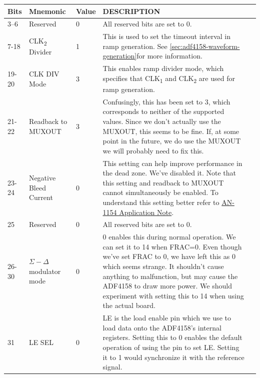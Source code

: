 \label{tab:adf4158-reg-map-4}
\begin{tabularx}{\textwidth}{l l l X>{\raggedright\arraybackslash}X}
        \caption{TEST REGISTER(R4) MAP} \\
        \toprule
        \textbf{Bits} & \textbf{Mnemonic} & \textbf{Value} & \textbf{DESCRIPTION} \\
        \midrule

        \endhead{}

        3--6 & Reserved & 0 & All reserved bits are set to 0. \\
        7-18 & CLK\textsubscript{2} Divider & 1 & This is used to set the timeout interval in ramp
        generation. See
        \cref{sec:adf4158-waveform-generation}for more
        information. \\
        19-20 & CLK DIV Mode & 3 & This enables ramp divider mode, which specifies that
        CLK\textsubscript{1} and CLK\textsubscript{2} are used for ramp
        generation. \\
        21-22 & Readback to MUXOUT & 3 & Confusingly, this has been set to 3, which corresponds to neither
        of the supported values. Since we don't actually use the MUXOUT, this seems to be fine. If, at
        some point in the future, we do use the MUXOUT we will probably
        need to fix this. \\
        23-24 & Negative Bleed Current & 0 & This setting can help improve performance in the dead
        zone. We've disabled it. Note that this setting and readback
        to MUXOUT cannot simultaneously be enabled. To understand
        this setting better refer to \href{http://www.analog.com/media/en/technical-documentation/application-notes/AN-1154.pdf?doc=ADF4158.pdf}{AN-1154
          Application Note}. \\
        25 & Reserved & 0 & All reserved bits are set to 0. \\
        26-30 & $\Sigma-\Delta$ modulator mode & 0 & 0 enables this during normal operation. We can set it
        to 14 when FRAC=0. Even though we've set FRAC to 0,
        we have left this as 0 which seems strange. It
        shouldn't cause anything to malfunction, but may
        cause the ADF4158 to draw more power. We should
        experiment with setting this to 14 when using the
        actual board. \\
        31 & LE SEL & 0 & LE is the load enable pin which we use to load data onto the ADF4158's internal
        registers. Setting this to 0 enables the default operation of using the pin to
        set LE. Setting it to 1 would synchronize it with the reference signal. \\

        \bottomrule
\end{tabularx}

